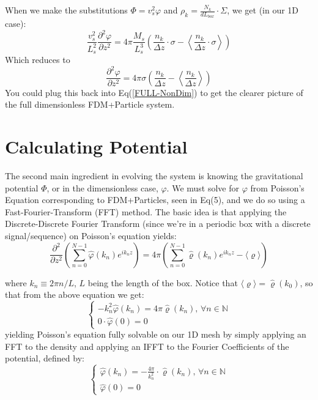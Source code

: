 \documentclass[oneside]{book}
\newcommand{\pd}{\partial}
\begin{document}
When we make the substitutions $\Phi = v_s^2 \varphi$ and $\rho_k = \frac{N_k}{dL_{box}}\cdot \Sigma$, we get (in our 1D case):
\begin{equation*}
    \frac{v_s^2}{L_s^2}\frac{\pd^2 \varphi}{\pd z^2} = 4\pi \frac{M_s}{L_s^3} \left( \frac{n_k}{\Delta z}\cdot \sigma - \left\langle \frac{n_k}{\Delta z}\cdot \sigma \right\rangle\right)
\end{equation*}
Which reduces to
\begin{equation}
    \frac{\pd^2 \varphi}{\pd z^2} = 4\pi \sigma \left( \frac{n_k}{\Delta z} - \left\langle \frac{n_k}{\Delta z}\right\rangle\right)
    \label{Particle NonDim Poisson's Equation}
\end{equation}
You could plug this back into Eq(\ref{FULL-NonDim}) to get the clearer picture of the full dimensionless FDM+Particle system.

\section{Calculating Potential}\label{Poisson Solver}
The second main ingredient in evolving the system is knowing the gravitational potential $\Phi$, or in the dimensionless case, $\varphi$. We must solve for $\varphi$ from Poisson's Equation corresponding to FDM+Particles, seen in Eq(5), and we do so using a Fast-Fourier-Transform (FFT) method. The basic idea is that applying the Discrete-Discrete Fourier Transform (since we're in a periodic box with a discrete signal/sequence) on Poisson's equation yields:
\begin{equation*}
    \frac{\pd^2}{\pd z^2}\left(\sum_{n=0}^{N-1} \hat{\varphi}(k_n) e^{i k_n z}\right) = 4 \pi \left(\sum_{n=0}^{N-1} \hat{\varrho}(k_n) e^{i k_n z} - \langle\varrho\rangle\right)
\end{equation*}

where $k_n \equiv 2\pi n / L$, $L$ being the length of the box. Notice that $\langle\varrho\rangle = \hat{\varrho}(k_0)$, so that from the above equation we get:
\begin{equation*}
    \begin{cases}
    -k_n^2 \hat{\varphi}(k_n) = 4 \pi \hat{\varrho}(k_n) \text{, $\forall n \in \mathbb{N}$} \\
    0\cdot \hat{\varphi}(0) = 0
    \end{cases}
\end{equation*}
yielding Poisson's equation fully solvable on our 1D mesh by simply applying an FFT to the density and applying an IFFT to the Fourier Coefficients of the potential, defined by:
\begin{equation*}
    \begin{cases}
    \hat{\varphi}(k_n) = - \frac{4 \pi}{k_n^2} \cdot \hat{\varrho}(k_n) \text{, $\forall n \in \mathbb{N}$} \\
    \hat{\varphi}(0) = 0
    \end{cases}
\end{equation*}
\end{document}
